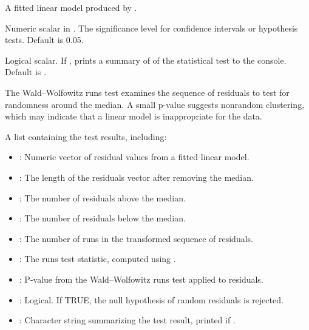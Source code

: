 \documentclass[a4paper]{book}
\begin{document}
%
\begin{Arguments}
\begin{ldescription}
\item[\code{results}] A fitted linear model produced by .

\item[\code{alpha}] Numeric scalar in \eqn{[0.01, 0.1]}{}. The significance
level for confidence intervals or hypothesis tests. Default is 0.05.

\item[\code{quiet}] Logical scalar. If , prints a summary of of the statistical
test to the console. Default is .
\end{ldescription}
\end{Arguments}
%
\begin{Details}
The Wald–Wolfowitz runs test examines the sequence of residuals to test for
randomness around the median. A small p-value suggests nonrandom clustering,
which may indicate that a linear model is inappropriate for the data.
\end{Details}
%
\begin{Value}
A list containing the test results, including:
\begin{itemize}

\item{} : Numeric vector of residual values from a fitted linear model.
\item{} : The length of the residuals vector after removing the median.
\item{} : The number of residuals above the median.
\item{} : The number of residuals below the median.
\item{} : The number of runs in the transformed sequence of residuals.
\item{} : The runs test statistic, computed using .
\item{} : P-value from the Wald–Wolfowitz runs test applied to residuals.
\item{} : Logical. If TRUE, the null hypothesis of random residuals is rejected.
\item{} : Character string summarizing the test result, printed if .

\end{itemize}

\end{Value}
\end{document}
